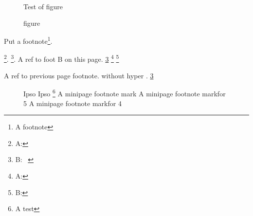 \documentclass{book}
\begin{document}
\begin{figure}[b]
Test of figure
\caption{figure}
\end{figure}
\blindtext
Put a footnote\footnote{A footnote}.

\Blindtext[3][4]
\newpage
\blindtext
\footnote{A: \blindtext}.
\blindtext
\footnote{B: \blindtext \label{foot:B}}.
A ref to foot B on this page.
\ref{foot:B}
\newpage
\blindtext
\footnote{A: \blindtext}%
\footnote{B: \blindtext}

\newpage
A ref to previous page footnote. without hyper .
\ref{foot:B}
\blindtext
\begin{figure}
\begin{minipage}{0.7\textwidth}
Ipso Ipso
\footnote{A test}
A minipage footnote mark\mpfootnotemark
A minipage footnote mark\mpfootnotemark[5] for 5
A minipage footnote mark\mpfootnotemark for 4
\end{minipage}
\end{figure}
\blindtext

\newpage
\blindtext\footnotemark {}

\makeatletter
\ExplSyntaxOn
\end{document}

